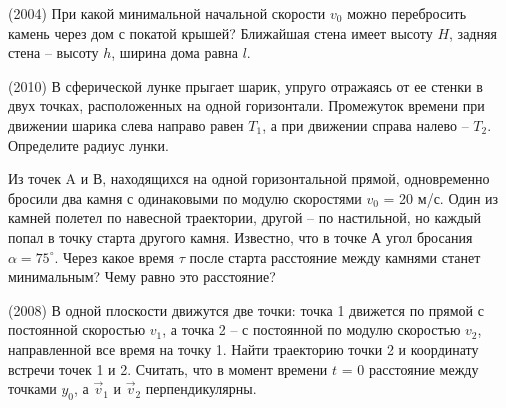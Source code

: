 \AddProb (2004) При какой минимальной начальной скорости $v_0$ можно перебросить камень через дом с покатой крышей? 
Ближайшая стена имеет высоту $H$, задняя стена -- высоту $h$, ширина дома равна $l$.

\AddProb (2010) В сферической лунке прыгает шарик, упруго отражаясь от ее стенки в двух точках, расположенных на одной горизонтали. 
Промежуток времени при движении шарика слева направо равен $T_{1}$, а при движении справа налево -- $T_2$. Определите радиус лунки.

\AddProb Из точек A и В, находящихся на одной горизонтальной прямой, одновременно бросили два камня с одинаковыми по модулю скоростями $v_0$ = 20 м/с. 
Один из камней полетел по навесной траектории, другой -- по настильной, но каждый попал в точку старта другого камня. 
Известно, что в точке А угол бросания $\alpha = 75^{\circ}$. 
Через какое время $\tau$ после старта расстояние между камнями станет минимальным? Чему равно это расстояние?

\AddProb (2008) В одной плоскости движутся две точки: точка 1 движется по прямой с постоянной скоростью $v_1$, 
а точка 2 -- с постоянной по модулю скоростью $v_2$, направленной все время на точку 1. 
Найти траекторию точки 2 и координату встречи точек 1 и 2. 
Считать, что в момент времени $t$ = 0 расстояние между точками $y_0$, а $\vec{v}_1$ и $\vec{v}_2$ перпендикулярны.
